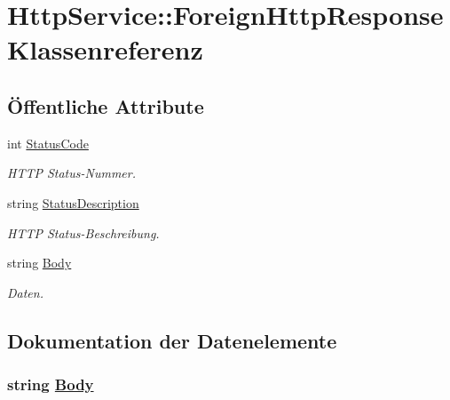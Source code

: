 \hypertarget{classQbeSAS_1_1HttpService_1_1ForeignHttpResponse}{
\section{Http\-Service::Foreign\-Http\-Response Klassenreferenz}
\label{classQbeSAS_1_1HttpService_1_1ForeignHttpResponse}
}
\subsection*{\"{O}ffentliche Attribute}
\begin{CompactItemize}
\item 
int \hyperlink{classQbeSAS_1_1HttpService_1_1ForeignHttpResponse_QbeSAS_1_1HttpService_1_1ForeignHttpResponseo0}{Status\-Code}
\begin{CompactList}\small\item\em HTTP Status-Nummer. \item\end{CompactList}\item 
string \hyperlink{classQbeSAS_1_1HttpService_1_1ForeignHttpResponse_QbeSAS_1_1HttpService_1_1ForeignHttpResponseo1}{Status\-Description}
\begin{CompactList}\small\item\em HTTP Status-Beschreibung. \item\end{CompactList}\item 
string \hyperlink{classQbeSAS_1_1HttpService_1_1ForeignHttpResponse_QbeSAS_1_1HttpService_1_1ForeignHttpResponseo2}{Body}
\begin{CompactList}\small\item\em Daten. \item\end{CompactList}\end{CompactItemize}


\subsection{Dokumentation der Datenelemente}
\hypertarget{classQbeSAS_1_1HttpService_1_1ForeignHttpResponse_QbeSAS_1_1HttpService_1_1ForeignHttpResponseo2}{
\subsubsection[Body]{\setlength{\rightskip}{0pt plus 5cm}string \hyperlink{classQbeSAS_1_1HttpService_1_1ForeignHttpResponse_QbeSAS_1_1HttpService_1_1ForeignHttpResponseo2}{Body}}}
\label{classQbeSAS_1_1HttpService_1_1ForeignHttpResponse_QbeSAS_1_1HttpService_1_1ForeignHttpResponseo2}


